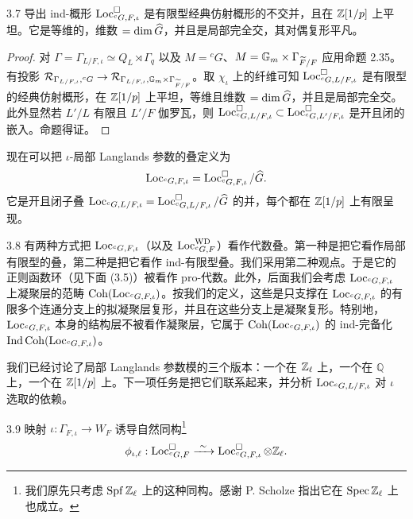 \begin{prop}{3.7}
导出 ind-概形 $\operatorname{Loc}^{\square}_{{}^cG,F,\iota}$ 是有限型经典仿射概形的不交并，且在 $\mathbb{Z}[1/p]$ 上平坦。它是等维的，维数 $=\dim\widehat{G}$，并且是局部完全交，其对偶复形平凡。
\end{prop}

\begin{proof}
对 $\Gamma=\Gamma_{L/F,\iota}\simeq Q_L\rtimes\Gamma_q$ 以及 $M={}^cG$、$M=\mathbb G_m\times\Gamma_{\widetilde F/F}$ 应用命题 2.35。有投影 $\mathcal R_{\Gamma_{L/F,\iota},{}^cG}\to\mathcal R_{\Gamma_{L/F,\iota},\mathbb G_m\times\Gamma_{\widetilde F/F}}$。取 $\chi_\iota$ 上的纤维可知 $\operatorname{Loc}^{\square}_{{}^cG,L/F,\iota}$ 是有限型的经典仿射概形，在 $\mathbb{Z}[1/p]$ 上平坦，等维且维数 $=\dim\widehat{G}$，并且是局部完全交。此外显然若 $L'/L$ 有限且 $L'/F$ 伽罗瓦，则 $\operatorname{Loc}^{\square}_{{}^cG,L/F,\iota}\subset\operatorname{Loc}^{\square}_{{}^cG,L'/F,\iota}$ 是开且闭的嵌入。命题得证。
\end{proof}

现在可以把 $\iota$-局部 Langlands 参数的叠定义为
\[
\operatorname{Loc}_{{}^cG,F,\iota}=\operatorname{Loc}^{\square}_{{}^cG,F,\iota}/\widehat{G}.
\]
它是开且闭子叠 $\operatorname{Loc}_{{}^cG,L/F,\iota}=\operatorname{Loc}^{\square}_{{}^cG,L/F,\iota}/\widehat{G}$ 的并，每个都在 $\mathbb{Z}[1/p]$ 上有限呈现。

\begin{rem}{3.8}
有两种方式把 $\operatorname{Loc}_{{}^cG,F,\iota}$（以及 $\operatorname{Loc}^{\mathrm{WD}}_{{}^cG,F}$）看作代数叠。第一种是把它看作局部有限型的叠，第二种是把它看作 ind-有限型叠。我们采用第二种观点。于是它的正则函数环（见下面 (3.5)）被看作 pro-代数。此外，后面我们会考虑 $\operatorname{Loc}_{{}^cG,F,\iota}$ 上凝聚层的范畴 $\operatorname{Coh}(\operatorname{Loc}_{{}^cG,F,\iota})$。按我们的定义，这些是只支撑在 $\operatorname{Loc}_{{}^cG,F,\iota}$ 的有限多个连通分支上的拟凝聚层复形，并且在这些分支上是凝聚复形。特别地，$\operatorname{Loc}_{{}^cG,F,\iota}$ 本身的结构层不被看作凝聚层，它属于 $\operatorname{Coh}(\operatorname{Loc}_{{}^cG,F,\iota})$ 的 ind-完备化 $\operatorname{Ind}\operatorname{Coh}(\operatorname{Loc}_{{}^cG,F,\iota})$。
\end{rem}

我们已经讨论了局部 Langlands 参数模的三个版本：一个在 $\mathbb{Z}_\ell$ 上，一个在 $\mathbb Q$ 上，一个在 $\mathbb{Z}[1/p]$ 上。下一项任务是把它们联系起来，并分析 $\operatorname{Loc}_{{}^cG,L/F,\iota}$ 对 $\iota$ 选取的依赖。

\begin{lem}{3.9}
映射 $\iota:\Gamma_{F,\iota}\to W_F$ 诱导自然同构\footnote{我们原先只考虑 $\operatorname{Spf}\mathbb{Z}_\ell$ 上的这种同构。感谢 P. Scholze 指出它在 $\operatorname{Spec}\mathbb{Z}_\ell$ 上也成立。}
\[
\phi_{\iota,\ell}:\Loc^{\square}_{{}^cG,F}\xrightarrow{\ \sim\ }\Loc^{\square}_{{}^cG,F,\iota}\otimes\Z_\ell.
\]
\end{lem}

